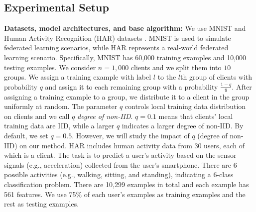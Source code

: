 \documentclass[letterpaper]{article} %
\begin{document}
\begin{table}[!tb]
\centering
{}
\caption{Federated learning settings and hyperparameters.}
\label{tab:hyperparameters}
\end{table}

\subsection{Experimental Setup}

\noindent
{\bf Datasets, model architectures, and base algorithm:} We use MNIST \cite{lecun2010mnist} and Human Activity Recognition (HAR) datasets \cite{anguita2013public}.  MNIST is used to simulate federated learning scenarios, while  HAR represents a real-world federated learning scenario. Specifically, MNIST has 60,000 training examples and 10,000 testing examples. We consider $n=1,000$ clients and we split them into $10$ groups. We assign a training example with label $l$ to the $l$th group of clients with probability $q$ and assign it to each remaining group with a probability $\frac{1-q}{9}$. After assigning a training example to a group, we distribute it to a client in the group uniformly at random.
The parameter $q$ controls local training data distribution on clients and we call $q$ \emph{degree of non-IID}.  $q=0.1$ means that clients' local training data are IID, while a larger $q$ indicates a larger {degree of non-IID}. By default, we set $q=0.5$. However, we will study the impact of $q$ (degree of non-IID) on our method. HAR includes human activity data from 30 users, each of which is a client. The task is to predict a user's activity based on the sensor signals (e.g., acceleration) collected from the user's smartphone.  There are 6 possible activities (e.g., walking, sitting, and standing), indicating  a 6-class classification problem.  There are 10,299 examples in total and each example has 561 features. We use 75\% of each user's examples as training examples and the rest as testing examples.
\end{document}
